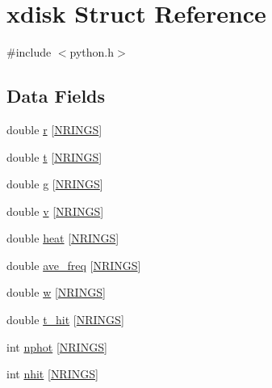 \hypertarget{structxdisk}{}\section{xdisk Struct Reference}
\label{structxdisk}


{\ttfamily \#include $<$python.\+h$>$}

\subsection*{Data Fields}
\begin{DoxyCompactItemize}
\item 
double \hyperlink{structxdisk_a4ca6d46d2d2873fbd971da347b14b073}{r} \mbox{[}\hyperlink{python_8h_af8b02d1bed15b59f7062901b55c4d123}{N\+R\+I\+N\+GS}\mbox{]}
\item 
double \hyperlink{structxdisk_a88f7151e3a7f53de1fb9766c0d41b382}{t} \mbox{[}\hyperlink{python_8h_af8b02d1bed15b59f7062901b55c4d123}{N\+R\+I\+N\+GS}\mbox{]}
\item 
double \hyperlink{structxdisk_aab482a2209b216c79d450ff3adf103f3}{g} \mbox{[}\hyperlink{python_8h_af8b02d1bed15b59f7062901b55c4d123}{N\+R\+I\+N\+GS}\mbox{]}
\item 
double \hyperlink{structxdisk_a3a23c417cee1fe61baf6a6af9dc84b2a}{v} \mbox{[}\hyperlink{python_8h_af8b02d1bed15b59f7062901b55c4d123}{N\+R\+I\+N\+GS}\mbox{]}
\item 
double \hyperlink{structxdisk_a34624d7a4f7db389afb745110b43a82c}{heat} \mbox{[}\hyperlink{python_8h_af8b02d1bed15b59f7062901b55c4d123}{N\+R\+I\+N\+GS}\mbox{]}
\item 
double \hyperlink{structxdisk_aba52b04695b1df389f04944f8a8d69cf}{ave\+\_\+freq} \mbox{[}\hyperlink{python_8h_af8b02d1bed15b59f7062901b55c4d123}{N\+R\+I\+N\+GS}\mbox{]}
\item 
double \hyperlink{structxdisk_a0cfeacb568d69b8a9ae73c33c0f7419c}{w} \mbox{[}\hyperlink{python_8h_af8b02d1bed15b59f7062901b55c4d123}{N\+R\+I\+N\+GS}\mbox{]}
\item 
double \hyperlink{structxdisk_a9c645ab31a3dbdd61812c27e510a5437}{t\+\_\+hit} \mbox{[}\hyperlink{python_8h_af8b02d1bed15b59f7062901b55c4d123}{N\+R\+I\+N\+GS}\mbox{]}
\item 
int \hyperlink{structxdisk_a5812ceecd51e235f48eccda5b854f8e8}{nphot} \mbox{[}\hyperlink{python_8h_af8b02d1bed15b59f7062901b55c4d123}{N\+R\+I\+N\+GS}\mbox{]}
\item 
int \hyperlink{structxdisk_a85fc4d26f2ff6970c94cb6ac75d3b8cb}{nhit} \mbox{[}\hyperlink{python_8h_af8b02d1bed15b59f7062901b55c4d123}{N\+R\+I\+N\+GS}\mbox{]}
\end{DoxyCompactItemize}


